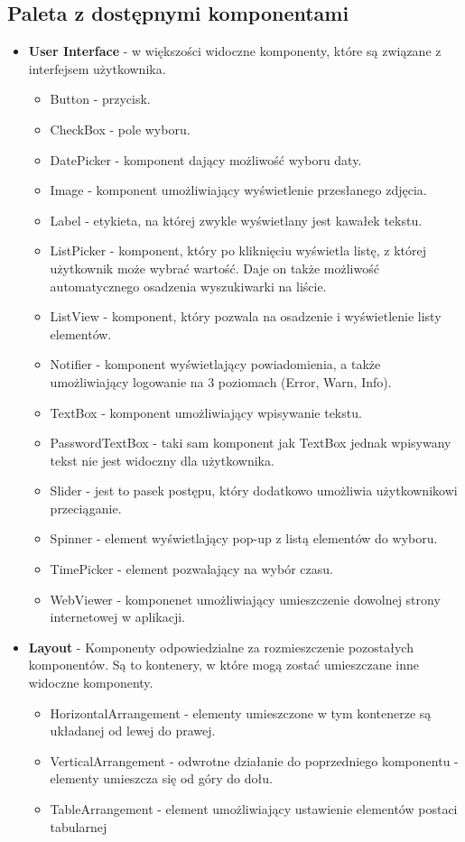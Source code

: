 \subsection{Paleta z dostępnymi komponentami}

\begin{itemize}

\item \textbf{User Interface} - w większości widoczne komponenty, które są związane z interfejsem użytkownika.
\begin{itemize}
\item Button - przycisk.
\item CheckBox - pole wyboru.
\item DatePicker - komponent dający możliwość wyboru daty.
\item Image - komponent umożliwiający wyświetlenie przesłanego zdjęcia.
\item Label - etykieta, na której zwykle wyświetlany jest kawałek tekstu.
\item ListPicker - komponent, który po kliknięciu wyświetla listę, z której użytkownik może wybrać wartość. Daje on także możliwość automatycznego osadzenia wyszukiwarki na liście.
\item ListView - komponent, który pozwala na osadzenie i wyświetlenie listy elementów.
\item Notifier - komponent wyświetlający powiadomienia, a także umożliwiający logowanie na 3 poziomach (Error, Warn, Info).
\item TextBox - komponent umożliwiający wpisywanie tekstu.
\item PasswordTextBox - taki sam komponent jak TextBox jednak wpisywany tekst nie jest widoczny dla użytkownika.
\item Slider - jest to pasek postępu, który dodatkowo umożliwia użytkownikowi przeciąganie.
\item Spinner - element wyświetlający pop-up z listą elementów do wyboru.
\item TimePicker - element pozwalający na wybór czasu.
\item WebViewer - komponenet umożliwiający umieszczenie dowolnej strony internetowej w aplikacji.
\end{itemize}

\item \textbf{Layout} - Komponenty odpowiedzialne za rozmieszczenie pozostałych komponentów. Są to kontenery, w które mogą zostać umieszczane inne widoczne komponenty.
\begin{itemize}
\item HorizontalArrangement - elementy umieszczone w tym kontenerze są układanej od lewej do prawej.
\item VerticalArrangement - odwrotne działanie do poprzedniego komponentu - elementy umieszcza się od góry do dołu.
\item TableArrangement - element umożliwiający ustawienie elementów postaci tabularnej
\end{itemize}



\end{itemize}
